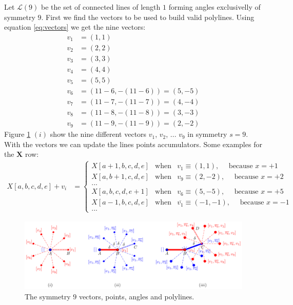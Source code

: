 \documentclass[11pt]{article}
\begin{document}
Let $\mathcal{L}(9)$ be the set of connected lines of length $1$ forming angles exclusivelly of symmetry $9$. First we find the vectors to be used to build valid polylines.
Using equation \ref{eq:vectors} we get the nine vectors:
\begin{align*}
v_1 &= (1,1)\\
v_2 &= (2,2)\\
v_3 &= (3,3)\\
v_4 &= (4,4)\\
v_5 &= (5,5)\\
v_6 &= (11-6,-(11-6)) = (5,-5)\\
v_7 &= (11-7,-(11-7)) = (4,-4)\\
v_8 &= (11-8,-(11-8)) = (3,-3)\\
v_9 &= (11-9,-(11-9)) = (2,-2)
\end{align*}
Figure \ref{fig:vectors-a} $(i)$ show the nine different vectors $v_1$, $v_2$, ... $v_9$ in symmetry $s=9$. With the vectors we can update the lines points accumulators. Some examples for the $\textbf{X}$ row:
\begin{align*}
X[a,b,c,d,e] + v_i &= \left\{ \begin{array}{ccl}
 X[a+1,b,c,d,e] & \mbox{when} & v_1\equiv(1,1),\quad \mbox{ because } x = +1\\
 X[a,b+1,c,d,e] & \mbox{when} & v_9\equiv(2,-2),\quad \mbox{ because } x = +2\\
 ... & & \\
 X[a,b,c,d,e+1] & \mbox{when} & v_6\equiv(5,-5),\quad \mbox{ because } x = +5\\
 X[a-1,b,c,d,e] & \mbox{when} & \overline{v_1}\equiv(-1,-1),\quad \mbox{ because } x = -1\\
 ... & &
 \end{array}\right.
\end{align*}


\begin{figure}[H]
\centering
\includegraphics[scale=1]{vectors-a}
\caption{The symmetry $9$ vectors, points, angles and polylines.}
\label{fig:vectors-a}
\end{figure}
\end{document}
